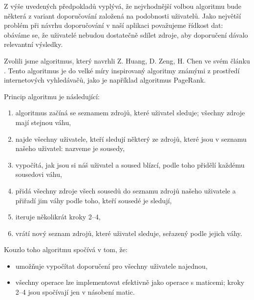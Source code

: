 Z výše uvedených předpokladů vyplývá, že nejvhodnější volbou algoritmu bude některá z variant doporučování založená na podobnosti uživatelů.
Jako největší problém při návrhu doporučování v naší aplikaci považujeme řídkost dat: obáváme se, že uživatelé nebudou dostatečně sdílet zdroje, aby doporučení dávalo relevantní výsledky.

Zvolili jsme algoritmus, který navrhli Z. Huang, D. Zeng, H. Chen ve svém článku .
Tento algoritmus je do velké míry inspirovaný algoritmy známými z prostředí internetových vyhledávačů, jako je například algoritmus PageRank.

Princip algoritmu je následující:
\begin{enumerate}
    \item algoritmus začíná se seznamem zdrojů, které uživatel sleduje; všechny zdroje mají stejnou váhu,
    \item najde všechny uživatele, kteří sledují některý ze zdrojů, které jsou v seznamu našeho uživatel: nazveme je sousedy,
    \item vypočítá, jak jsou si náš uživatel a soused blízcí, podle toho přidělí každému sousedovi váhu,
    \item přidá všechny zdroje všech sousedů do seznamu zdrojů našeho uživatele a přiřadí jim váhy podle toho, kteří sousedé je sledují,
    \item iteruje několikrát kroky 2--4,
    \item vrátí nový seznam zdrojů, které uživatel sleduje, seřazený podle jejich váhy.
\end{enumerate}

Kouzlo toho algoritmu spočívá v tom, že:
\begin{itemize}
    \item umožňuje vypočítat doporučení pro všechny uživatele najednou,
    \item všechny operace lze implementovat efektivně jako operace s maticemi; kroky 2--4 jsou spočívají jen v násobení matic.
\end{itemize}

